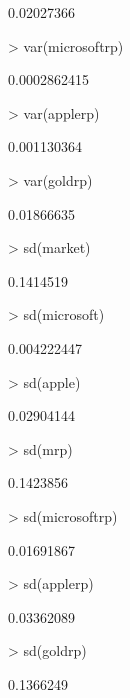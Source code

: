 \documentclass[12pt, a14paper, lithuanian]{article}
\begin{document}
\begin{Schunk}
\begin{Soutput}
[1] 0.02027366
\end{Soutput}
\begin{Sinput}
> var(microsoftrp)
\end{Sinput}
\begin{Soutput}
[1] 0.0002862415
\end{Soutput}
\begin{Sinput}
> var(applerp)
\end{Sinput}
\begin{Soutput}
[1] 0.001130364
\end{Soutput}
\begin{Sinput}
> var(goldrp)
\end{Sinput}
\begin{Soutput}
[1] 0.01866635
\end{Soutput}
\begin{Sinput}
> sd(market)
\end{Sinput}
\begin{Soutput}
[1] 0.1414519
\end{Soutput}
\begin{Sinput}
> sd(microsoft)
\end{Sinput}
\begin{Soutput}
[1] 0.004222447
\end{Soutput}
\begin{Sinput}
> sd(apple)
\end{Sinput}
\begin{Soutput}
[1] 0.02904144
\end{Soutput}
\begin{Sinput}
> sd(mrp)
\end{Sinput}
\begin{Soutput}
[1] 0.1423856
\end{Soutput}
\begin{Sinput}
> sd(microsoftrp)
\end{Sinput}
\begin{Soutput}
[1] 0.01691867
\end{Soutput}
\begin{Sinput}
> sd(applerp)
\end{Sinput}
\begin{Soutput}
[1] 0.03362089
\end{Soutput}
\begin{Sinput}
> sd(goldrp)
\end{Sinput}
\begin{Soutput}
[1] 0.1366249
\end{Soutput}

\end{Schunk}
\end{document}
